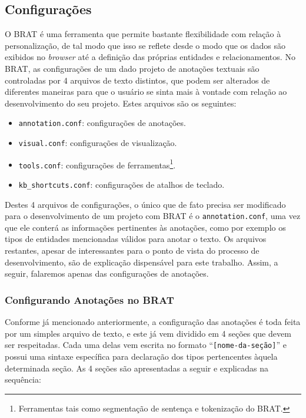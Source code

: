 \documentclass[11pt]{report}
\newcommand{\quotes}[1]{``#1''}
\begin{document}
\subsection{Configurações}

\indent\indent O BRAT é uma ferramenta que permite bastante flexibilidade com relação à personalização, de tal modo que isso se reflete desde
o modo que os dados são exibidos no \textit{browser} até a definição das próprias entidades e relacionamentos. No BRAT, as configurações de um dado projeto de anotações
textuais são controladas por 4 arquivos de texto distintos, que podem ser alterados de diferentes maneiras para que o usuário se sinta mais à vontade com relação ao desenvolvimento do
seu projeto. Estes arquivos são os seguintes:

\begin{itemize}
  \item \texttt{annotation.conf}: configurações de anotações.
  \item \texttt{visual.conf}: configurações de visualização.
  \item \texttt{tools.conf}: configurações de ferramentas\footnote[5]{Ferramentas tais como segmentação de sentença e tokenização do BRAT.}.
  \item \texttt{kb\_shortcuts.conf}: configurações de atalhos de teclado.
\end{itemize}

Destes 4 arquivos de configurações, o único que de fato precisa ser modificado para o desenvolvimento de um projeto com BRAT é o \texttt{annotation.conf}, uma vez que ele
conterá as informações pertinentes às anotações, como por exemplo os tipos de entidades mencionadas válidos para anotar o texto. Os arquivos restantes, apesar de interessantes
para o ponto de vista do processo de desenvolvimento, são de explicação dispensável para este trabalho. Assim, a seguir, falaremos apenas das configurações de anotações.

\subsubsection{Configurando Anotações no BRAT}

\indent\indent Conforme já mencionado anteriormente, a configuração das anotações é toda feita por um simples arquivo de texto, e este já vem dividido em 4 seções que devem ser
respeitadas. Cada uma delas vem escrita no formato \quotes{\texttt{[nome-da-seção]}} e possui uma sintaxe específica para declaração dos tipos pertencentes àquela
determinada seção. As 4 seções são apresentadas a seguir e explicadas na sequência:
\end{document}
